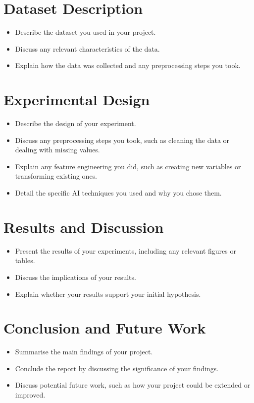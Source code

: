 \documentclass{article}
\begin{document}
\section{Dataset Description}
\label{sec:dataset_description}
\begin{itemize}
    \item Describe the dataset you used in your project.
    \item Discuss any relevant characteristics of the data.
    \item Explain how the data was collected and any preprocessing steps you took.
\end{itemize}

\section{Experimental Design}
\label{sec:experimental_design}
\begin{itemize}
    \item Describe the design of your experiment.
    \item Discuss any preprocessing steps you took, such as cleaning the data or
          dealing with missing values.
    \item Explain any feature engineering you did, such as creating new variables
          or transforming existing ones.
    \item Detail the specific AI techniques you used and why you chose them.
\end{itemize}

\section{Results and Discussion}
\label{sec:results_and_discussion}
\begin{itemize}
    \item Present the results of your experiments, including any relevant figures
          or tables.
    \item Discuss the implications of your results.
    \item Explain whether your results support your initial hypothesis.
\end{itemize}

\section{Conclusion and Future Work}
\label{sec:conclusion_and_future_work}
\begin{itemize}
    \item Summarise the main findings of your project.
    \item Conclude the report by discussing the significance of your findings.
    \item Discuss potential future work, such as how your project could be extended
          or improved.
\end{itemize}
\end{document}

